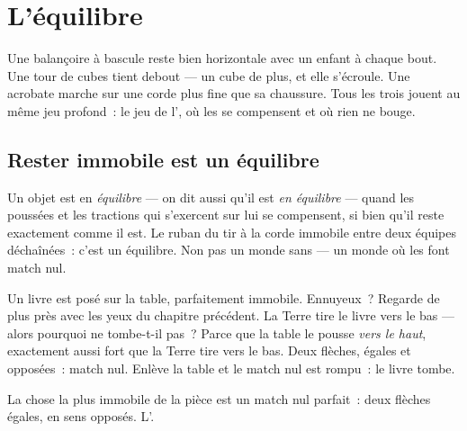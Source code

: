 \chapter{L'équilibre}\label{ch:g2:balance-equilibrium}

Une balançoire à bascule reste bien horizontale avec un enfant à
chaque bout. Une tour de cubes tient debout --- un cube de plus, et
elle s'écroule. Une acrobate marche sur une corde plus fine que sa
chaussure. Tous les trois jouent au même jeu profond~: le jeu de
l', où les  se compensent et où rien ne bouge.

\section{Rester immobile est un équilibre}

\begin{definition}[Équilibre]\label{def:g2:balance-equilibrium:equilibrium}
Un objet est en \emph{équilibre} --- on dit aussi
qu'il est \emph{en équilibre} --- quand les
poussées et les tractions qui s'exercent sur lui se compensent, si
bien qu'il reste exactement comme il est. Le ruban du tir à la corde
immobile entre deux équipes déchaînées~: c'est un équilibre. Non pas
un monde sans  --- un monde où les  font match nul.
\end{definition}

\begin{example}\label{ex:g2:balance-equilibrium:book}
Un livre est posé sur la table, parfaitement immobile. Ennuyeux~?
Regarde de plus près avec les yeux du chapitre précédent. La Terre
tire le livre vers le bas --- alors pourquoi ne tombe-t-il pas~?
Parce que la table le pousse \emph{vers le haut}, exactement aussi
fort que la Terre tire vers le bas. Deux flèches, égales et
opposées~: match nul. Enlève la table et le match nul est rompu~: le
livre tombe.
\end{example}

\begin{omfigure}

{\small La chose la plus immobile de la pièce est un match nul
parfait~: deux flèches égales, en sens opposés. L'.}
\end{omfigure}

